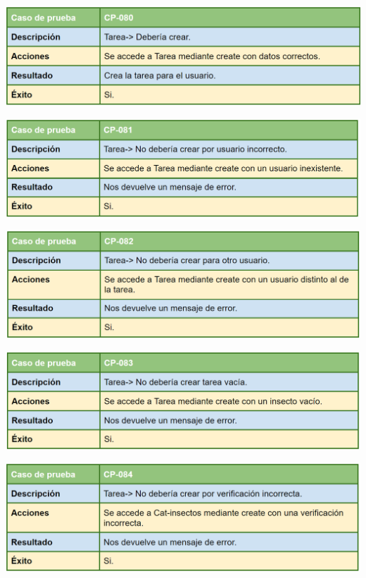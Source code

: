 \bigskip

\includegraphics[width=\textwidth]{img/cap7/cp-080.png}

\bigskip

\includegraphics[width=\textwidth]{img/cap7/cp-081.png}

\bigskip

\includegraphics[width=\textwidth]{img/cap7/cp-082.png}

\bigskip

\includegraphics[width=\textwidth]{img/cap7/cp-083.png}

\bigskip

\includegraphics[width=\textwidth]{img/cap7/cp-084.png}

